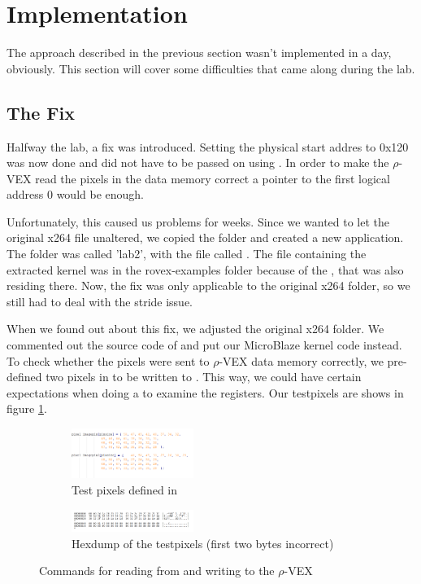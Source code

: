 
\section{Implementation}

The approach described in the previous section wasn't implemented in a day, obviously. This section will cover some difficulties that came along during the lab.

\subsection{The Fix}
Halfway the lab, a fix was introduced. Setting the physical start addres to 0x120 was now done and did not have to be passed on using . In order to make the $\rho$-VEX read the pixels in the data memory correct a pointer to the first logical address 0 would be enough.

Unfortunately, this caused us problems for weeks. Since we wanted to let the original x264 file unaltered, we copied the folder and created a new application. The folder was called 'lab2', with the  file called . The  file containing the extracted kernel was in the rovex-examples folder because of the , that was also residing there. Now, the fix was only applicable to the original x264 folder, so we still had to deal with the stride issue.

When we found out about this fix, we adjusted the original x264 folder. We commented out the source code of  and put our MicroBlaze kernel code instead. To check whether the pixels were sent to $\rho$-VEX data memory correctly, we pre-defined two pixels in  to be written to . This way, we could have certain expectations when doing a  to examine the registers. Our testpixels are shows in figure \ref{fig:test}.

\begin{figure}
	\centering
	\begin{subfigure} [h] {0.5\textwidth}
		\centering
		\includegraphics[width=150px]{Pictures/testpixels}
		\caption{Test pixels defined in }
		\label{fig:test}
	\end{subfigure}
	\quad
	\begin{subfigure} [h] {0.5\textwidth}
		\centering
		\includegraphics[width=150px]{Pictures/hextest}
		\caption{Hexdump of the testpixels (first two bytes incorrect)}
		\label{fig:testhex}
	\end{subfigure}
	\quad
\caption{Commands for reading from and writing to the $\rho$-VEX}%
\label{}%
\end{figure}


